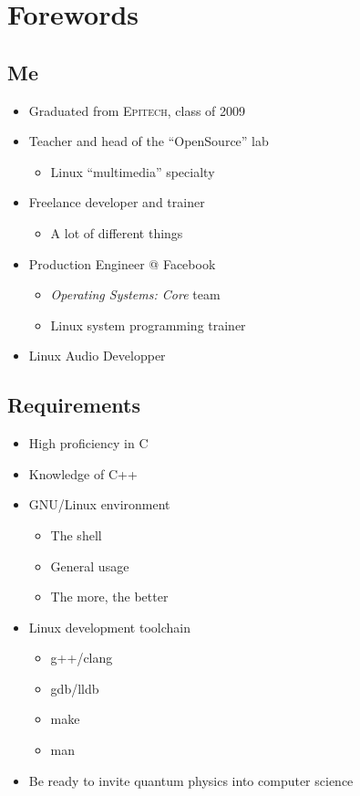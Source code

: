 \section*{Forewords}
\label{sec:forewords}

\subsection*{Me}
\begin{frame}
  \begin{itemize}
  \item Graduated from \textsc{Epitech}, class of 2009
  \item Teacher and head of the ``OpenSource'' lab
    \begin{itemize}
    \item Linux ``multimedia'' specialty
    \end{itemize}
  \item Freelance developer and trainer
    \begin{itemize}
    \item A lot of different things
    \end{itemize}
  \item Production Engineer @ Facebook
    \begin{itemize}
    \item \emph{Operating Systems: Core} team
    \item Linux system programming trainer
    \end{itemize}
  \item Linux Audio Developper
  \end{itemize}
\end{frame}


\subsection*{Requirements}
\begin{frame}
  \begin{itemize}
  \item High proficiency in C
  \item Knowledge of C++
  \item GNU/Linux environment
    \begin{itemize}
    \item The shell
    \item General usage
    \item The more, the better
    \end{itemize}
  \item Linux development toolchain
    \begin{itemize}
    \item g++/clang
    \item gdb/lldb
    \item make
    \item man
    \end{itemize}
  \item Be ready to invite quantum physics into computer science
  \end{itemize}
\end{frame}


